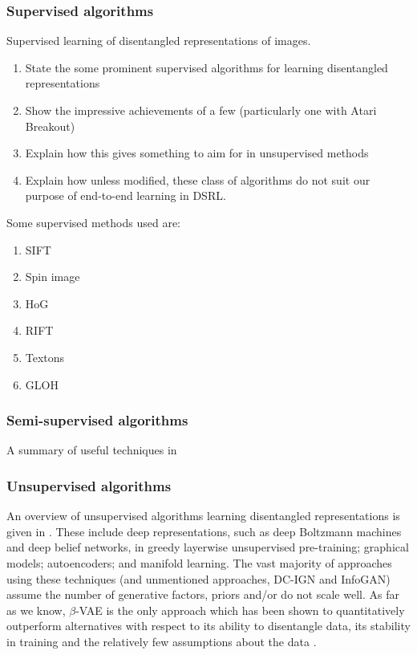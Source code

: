\documentclass[12pt,twoside]{article}
\begin{document}
\subsubsection{Supervised algorithms}

Supervised learning of disentangled representations of images.

\begin{enumerate}
\item State the some prominent supervised algorithms for learning disentangled representations
\item Show the impressive achievements of a few (particularly one with Atari Breakout)
\item Explain how this gives something to aim for in unsupervised methods
\item Explain how unless modified, these class of algorithms do not suit our purpose of end-to-end learning in DSRL.
\end{enumerate}

Some supervised methods used are:

\begin{enumerate}
\item SIFT
\item Spin image
\item HoG
\item RIFT
\item Textons
\item GLOH
\end{enumerate}

\subsubsection{Semi-supervised algorithms}

A summary of useful techniques in \cite{IanGoodfellowYoshuaBengio2015}


\subsubsection{Unsupervised algorithms}

An overview of unsupervised algorithms learning disentangled representations is given in \cite{Bengio2013}. These include deep representations, such as deep Boltzmann machines and deep belief networks, in greedy layerwise unsupervised pre-training; graphical models; autoencoders; and manifold learning. The vast majority of approaches using these techniques (and unmentioned approaches, DC-IGN and InfoGAN) assume the number of generative factors, priors and/or do not scale well. As far as we know, $\beta$-VAE is the only approach which has been shown to quantitatively outperform alternatives with respect to its ability to disentangle data, its stability in training and the relatively few assumptions about the data \cite{Higgins2016}.\\
\end{document}
